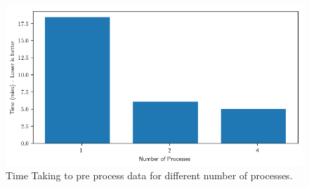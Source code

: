 \begin{figure}[h]
    \centering
    \includegraphics[width=\columnwidth]{tex/figures/multiprocess/multi_process_time.png}
    \caption{Time Taking to pre process data for different number of processes.}
    \label{fig:multip:time}
\end{figure}
